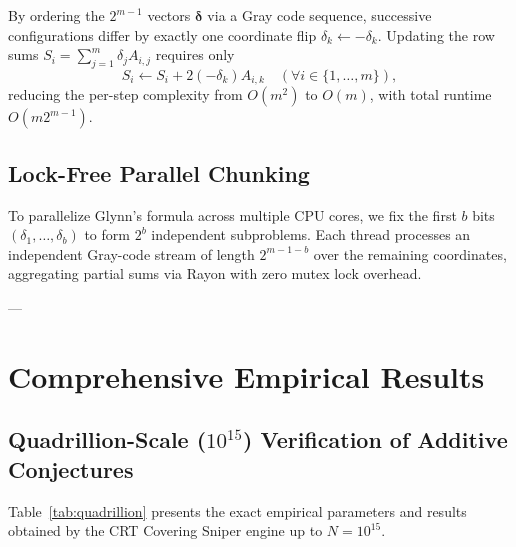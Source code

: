 \documentclass[11pt,a4paper]{article}
\theoremstyle{definition}
\theoremstyle{remark}
\begin{document}
By ordering the $2^{m-1}$ vectors $\boldsymbol{\delta}$ via a Gray code sequence, successive configurations differ by exactly one coordinate flip $\delta_k \leftarrow -\delta_k$. Updating the row sums $S_i = \sum_{j=1}^m \delta_j A_{i,j}$ requires only
\begin{equation}
S_i \leftarrow S_i + 2 (-\delta_k) A_{i,k} \quad (\forall i \in \{1, \dots, m\}),
\end{equation}
reducing the per-step complexity from $O(m^2)$ to $O(m)$, with total runtime $O(m 2^{m-1})$.

\subsection{Lock-Free Parallel Chunking}
To parallelize Glynn's formula across multiple CPU cores, we fix the first $b$ bits $(\delta_1, \dots, \delta_b)$ to form $2^b$ independent subproblems. Each thread processes an independent Gray-code stream of length $2^{m - 1 - b}$ over the remaining coordinates, aggregating partial sums via Rayon with zero mutex lock overhead.

---

\section{Comprehensive Empirical Results}

\subsection{Quadrillion-Scale ($10^{15}$) Verification of Additive Conjectures}
Table~\ref{tab:quadrillion} presents the exact empirical parameters and results obtained by the CRT Covering Sniper engine up to $N = 10^{15}$.

\begin{table}[htbp]
\centering
\caption{CRT Covering Sniper verification parameters and results up to $10^{15}$.}
\label{tab:quadrillion}
\end{table}
\end{document}
